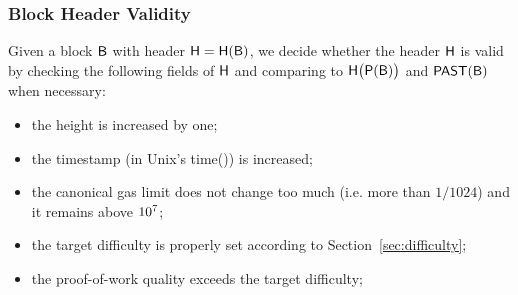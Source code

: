 \subsubsection{Block Header Validity}
\label{sec:valid header}

Given a block $\textsf{B}$ with header $\textsf{H}=\textsf{H}(\textsf{B})$, 
we decide whether the header $\textsf{H}$ is valid by 
checking the following fields of $\textsf{H}$
and comparing to $\textsf{H}\big(\mathsf{P}(\textsf{B})\big)$ and $\mathsf{PAST}(\textsf{B})$ when necessary:

\begin{itemize}[nosep]
	\item the height is increased by one;
	\item the timestamp (in Unix's time()) is increased;

	\item the canonical gas limit does not change too much (i.e. more than $1/1024$) and it remains above $10^7$;

	\item the target difficulty is properly set according to Section~\ref{sec:difficulty};

	\item the proof-of-work quality exceeds the target difficulty; 





\end{itemize}

